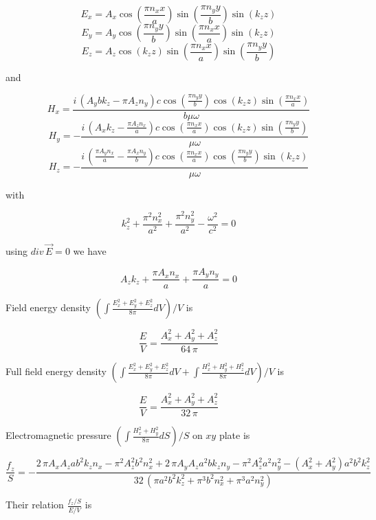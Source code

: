 \documentclass[11pt]{article}
\begin{document}
\[E_{x} = A_{x} \cos\left(\frac{\pi n_{x} x}{a}\right) \sin\left(\frac{\pi n_{y} y}{b}\right) \sin\left(k_{z} z\right)\]
\[E_{y} = A_{y} \cos\left(\frac{\pi n_{y} y}{b}\right) \sin\left(\frac{\pi n_{x} x}{a}\right) \sin\left(k_{z} z\right)\]
\[E_{z} = A_{z} \cos\left(k_{z} z\right) \sin\left(\frac{\pi n_{x} x}{a}\right) \sin\left(\frac{\pi n_{y} y}{b}\right)\]

and

\[H_{x} = \frac{i \, {\left(A_{y} b k_{z} - \pi A_{z} n_{y}\right)} c \cos\left(\frac{\pi n_{y} y}{b}\right) \cos\left(k_{z} z\right) \sin\left(\frac{\pi n_{x} x}{a}\right)}{b \mu \omega}\]
\[H_{y} = -\frac{i \, {\left(A_{x} k_{z} - \frac{\pi A_{z} n_{x}}{a}\right)} c \cos\left(\frac{\pi n_{x} x}{a}\right) \cos\left(k_{z} z\right) \sin\left(\frac{\pi n_{y} y}{b}\right)}{\mu \omega}\]
\[H_{z} = -\frac{i \, {\left(\frac{\pi A_{y} n_{x}}{a} - \frac{\pi A_{x} n_{y}}{b}\right)} c \cos\left(\frac{\pi n_{x} x}{a}\right) \cos\left(\frac{\pi n_{y} y}{b}\right) \sin\left(k_{z} z\right)}{\mu \omega}\]

with

\[k_{z}^{2} + \frac{\pi^{2} n_{x}^{2}}{a^{2}} + \frac{\pi^{2} n_{y}^{2}}{a^{2}} - \frac{\omega^{2}}{c^{2}} = 0\]

using \(div\,\vec{E} = 0\) we have

\[A_{z} k_{z} + \frac{\pi A_{x} n_{x}}{a} + \frac{\pi A_{y} n_{y}}{a} = 0\]

Field energy density
\(\left(\int \frac{E_x^2+E_y^2+E_z^2}{8 \pi}dV\right)\big/{V}\) is

\[\frac{E}{V} = \frac{{A_{x}^{2} + A_{y}^{2} + A_{z}^{2}} }{64 \, \pi}\]

    Full field energy density
\(\left(\int \frac{E_x^2+E_y^2+E_z^2}{8 \pi}dV + \int \frac{H_x^2+H_y^2+H_z^2}{8 \pi}dV\right)\big/{V}\)
is

    \[\frac{E}{V} = \frac{{A_{x}^{2} + A_{y}^{2} + A_{z}^{2}}}{32 \, \pi}\]

    Electromagnetic pressure
\(\left({\int \frac {H_x^2+H_y^2}{8 \pi} dS}\right)\big/{S}\) on \(xy\)
plate is

    \[\frac{f_z}{S} = -\frac{2 \, \pi A_{x} A_{z} a b^{2} k_{z} n_{x} - \pi^{2} A_{z}^{2} b^{2} n_{x}^{2} + 2 \, \pi A_{y} A_{z} a^{2} b k_{z} n_{y} - \pi^{2} A_{z}^{2} a^{2} n_{y}^{2} - {\left(A_{x}^{2} + A_{y}^{2}\right)} a^{2} b^{2} k_{z}^{2}}{32 \, {\left(\pi a^{2} b^{2} k_{z}^{2} + \pi^{3} b^{2} n_{x}^{2} + \pi^{3} a^{2} n_{y}^{2}\right)}}\]

    Their relation \(\frac{f_z/S}{E/V}\) is
\end{document}
